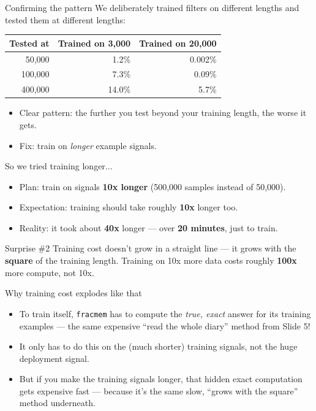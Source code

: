 \documentclass[11pt]{beamer}
\begin{document}
\begin{frame}{Confirming the pattern}
We deliberately trained filters on different lengths and tested them at different lengths:
\begin{table}
\centering
\small
\begin{tabular}{rrr}
\toprule
Tested at & Trained on 3,000 & Trained on 20,000 \\
\midrule
50,000   & 1.2\%  & 0.002\% \\
100,000  & 7.3\%  & 0.09\% \\
400,000  & 14.0\% & 5.7\% \\
\bottomrule
\end{tabular}
\end{table}
\begin{itemize}
\item Clear pattern: the further you test beyond your training length, the worse it gets.
\item Fix: train on \emph{longer} example signals.
\end{itemize}
\end{frame}

\begin{frame}{So we tried training longer...}
\begin{itemize}
\item Plan: train on signals \textbf{10x longer} (500,000 samples instead of 50,000).
\item Expectation: training should take roughly \textbf{10x} longer too.
\item Reality: it took about \textbf{40x} longer --- over \textbf{20 minutes}, just to train.
\end{itemize}
\begin{alertblock}{Surprise \#2}
Training cost doesn't grow in a straight line --- it grows with the \textbf{square} of the training length. Training on 10x more data costs roughly \textbf{100x} more compute, not 10x.
\end{alertblock}
\end{frame}

\begin{frame}{Why training cost explodes like that}
\begin{itemize}
\item To train itself, \texttt{fracmem} has to compute the \emph{true, exact} answer for its training examples --- the same expensive ``read the whole diary'' method from Slide 5!
\item It only has to do this on the (much shorter) training signals, not the huge deployment signal.
\item But if you make the training signals longer, that hidden exact computation gets expensive fast --- because it's the same slow, ``grows with the square'' method underneath.
\end{itemize}
\end{frame}
\end{document}
